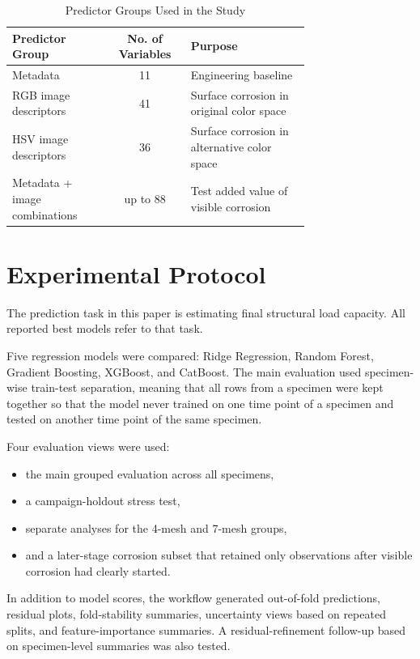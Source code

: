 \documentclass[conference]{IEEEtran}
\begin{document}
\begin{table}[t]
    \caption{Predictor Groups Used in the Study}
    \label{tab:predictors}
    \centering
    \small
    \begin{tabular}{L{0.33\linewidth}cL{0.4\linewidth}}
        \toprule
        Predictor Group & No. of Variables & Purpose \\
        \midrule
        Metadata & 11 & Engineering baseline \\
        RGB image descriptors & 41 & Surface corrosion in original color space \\
        HSV image descriptors & 36 & Surface corrosion in alternative color space \\
        Metadata + image combinations & up to 88 & Test added value of visible corrosion \\
        \bottomrule
    \end{tabular}
\end{table}

\section{Experimental Protocol}
The prediction task in this paper is estimating final structural load capacity. All reported best models refer to that task.

Five regression models were compared: Ridge Regression, Random Forest, Gradient Boosting, XGBoost, and CatBoost. The main evaluation used specimen-wise train-test separation, meaning that all rows from a specimen were kept together so that the model never trained on one time point of a specimen and tested on another time point of the same specimen.

Four evaluation views were used:
\begin{itemize}
    \item the main grouped evaluation across all specimens,
    \item a campaign-holdout stress test,
    \item separate analyses for the 4-mesh and 7-mesh groups,
    \item and a later-stage corrosion subset that retained only observations after visible corrosion had clearly started.
\end{itemize}

In addition to model scores, the workflow generated out-of-fold predictions, residual plots, fold-stability summaries, uncertainty views based on repeated splits, and feature-importance summaries. A residual-refinement follow-up based on specimen-level summaries was also tested.
\end{document}
